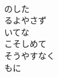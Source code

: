 \documentclass[10pt,b5j]{tarticle} %
\begin{document}
\begin{enumerate}
\begin{minipage}[c]{\blocksize}
    \end{minipage}
    \begin{minipage}[c]{\blocksize}
        
        \vspace{\linespace}
        \item~\\
        のした\\
        るよやさず\\
        いてな\\
        こそしめて\\
        そうやすなく\\
        もに
    
    \end{minipage}
\end{enumerate} %
\end{document}
